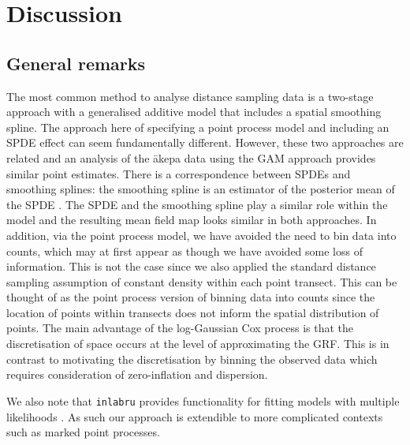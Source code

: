 \documentclass[preprint,12pt]{elsarticle}
\newcommand{\akepa}{\textquotesingle\={a}kepa}  %
\begin{document}
\bigskip

\newpage

\section*{Discussion}

\subsection*{General remarks}

The most common method to analyse distance sampling data is a two-stage approach with a generalised additive model that includes a spatial smoothing spline.  The approach here of specifying a point process model and including an SPDE effect can seem fundamentally different.  However, these two approaches are related and an analysis of the \akepa{} data using the GAM approach provides similar point estimates.  There is a correspondence between SPDEs and smoothing splines: the smoothing spline is an estimator of the posterior mean of the SPDE \citep{kimeldorf_spline_2002}.  The SPDE and the smoothing spline play a similar role within the model and the resulting mean field map looks similar in both approaches.  
In addition, via the point process model, we have avoided the need to bin data into counts, which may at first appear as though we have avoided some loss of information. This is not the case since we also applied the standard distance sampling assumption of constant density within each point transect.  This can be thought of as the point process version of binning data into counts since the location of points within transects does not inform the spatial distribution of points.  The main advantage of the log-Gaussian Cox process is that the discretisation of space occurs at the level of approximating the GRF.  This is in contrast to motivating the discretisation by binning the observed data which requires consideration of zero-inflation and dispersion.  

We also note that \texttt{inlabru} provides functionality for fitting models with multiple likelihoods \citep{bachl_inlabru_2019}.  As such our approach is extendible to more complicated contexts such as marked point processes.    
\end{document}
